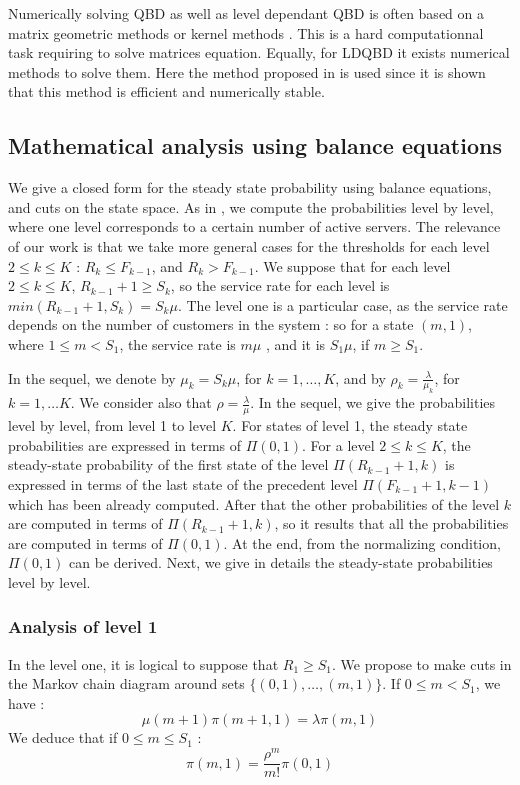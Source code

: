 \documentclass[conference]{IEEEtran}
\begin{document}
Numerically solving QBD as well as level dependant QBD is often based on a matrix geometric methods 
\cite{Neuts1981,art:latoucherama} or kernel methods \cite{gaujal2006optimal}. This is a hard computationnal task requiring to solve
matrices equation. Equally, for LDQBD it exists numerical methods to solve them. Here the method proposed in  \cite{baumann2010numerical} is used
since it is shown that this method is efficient and numerically stable.


\subsection{Mathematical analysis using balance equations} %
We give a closed form for the steady state probability using balance equations, and cuts on the state space. As 
in \cite{le2000simple}, we compute the probabilities level by level,
where one level corresponds to a certain number of  active servers. The relevance of our work is that we take more general cases for the thresholds  for each level $2 \leq k \leq K$ : $R_{k} \leq F_{k-1}$, and  $R_{k} > F_{k-1}$.
We suppose that for each level $2 \leq k \leq K$, $R_{k-1}+1 \geq S_k$, so the service rate for each level is 
$min(R_{k-1}+1, S_k)=S_k \mu$. The level one is a particular case, as the service rate depends on the number 
of customers in the system : so for a state $(m,1)$, where $1 \leq m < S_1$, the service rate is $m \mu$ , and it is 
$S_1 \mu$, if $m \geq S_1$.  

In the sequel, we denote by  $\mu_k=S_k \mu$, for $k=1, \ldots, K$,  and by $\rho_k = \frac{\lambda}{\mu_k}$, for $k=1,\ldots K$. We consider also that $\rho = \frac{\lambda} {\mu}$. In the sequel, we give the probabilities level by level, from level 1 to level $K$.
For states of level 1,  the steady state probabilities  are expressed in terms of $\Pi(0,1)$. For a level $2 \leq k \leq K$,  the steady-state probability of the  first state of the level $\Pi(R_{k-1}+1,k)$ is expressed in terms of the last state 
of the precedent level $\Pi(F_{k-1}+1,k-1)$ which has been already computed. After that the other probabilities of the level $k$ are computed in terms of $\Pi(R_{k-1}+1,k)$, so it results that all the probabilities  are computed in terms of 
$\Pi(0,1)$. At the end, from the normalizing condition, $\Pi(0,1)$ can be derived. Next, we give in details 
the steady-state probabilities level by level. 

\subsubsection{Analysis of level 1}
In the level one, it is logical to suppose that $R_1 \geq S_1$. 
We propose to make cuts  in the Markov chain diagram around sets 
$\{(0,1), \ldots, (m,1)\}$. If $0 \leq m <S_1$, we have :
\begin{equation}
 \mu(m+1) \pi(m+1,1)= \lambda \pi(m,1)\label{eq1}
 \end{equation}
\noindent We   deduce that if $0\leq m \leq S_1$ :
 \begin{equation}
 \pi(m,1)=\frac{\rho^{m}}{m!} \pi(0,1)
 \label{eq1a}
 \end{equation}
\end{document}
